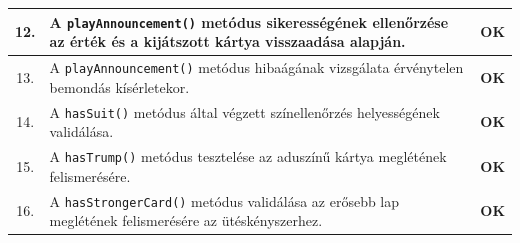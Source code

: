 \begin{longtable}{| c | m{11.5cm} | c |}
    12. & A \texttt{playAnnouncement()} metódus sikerességének ellenőrzése az érték és a kijátszott kártya visszaadása alapján. & \cellcolor{green!40}\textbf{OK} \\ \hline
    13. & A \texttt{playAnnouncement()} metódus hibaágának vizsgálata érvénytelen bemondás kísérletekor. & \cellcolor{green!40}\textbf{OK} \\ \hline
    14. & A \texttt{hasSuit()} metódus által végzett színellenőrzés helyességének validálása. & \cellcolor{green!40}\textbf{OK} \\ \hline
    15. & A \texttt{hasTrump()} metódus tesztelése az aduszínű kártya meglétének felismerésére. & \cellcolor{green!40}\textbf{OK} \\ \hline
    16. & A \texttt{hasStrongerCard()} metódus validálása az erősebb lap meglétének felismerésére az ütéskényszerhez. & \cellcolor{green!40}\textbf{OK} \\ \hline
\end{longtable}

